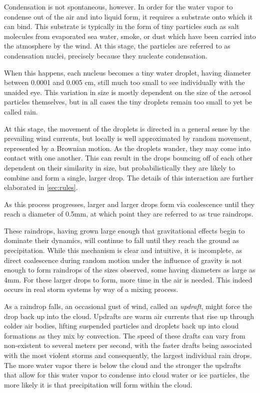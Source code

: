 \documentclass[twocolumn,a4paper,10pt]{article}
\begin{document}
Condensation is not spontaneous, however. In order for the water vapor to
condense out of the air and into liquid form, it requires a substrate onto which
it can bind.  This substrate is typically in the form of tiny particles such as
salt molecules from evaporated sea water, smoke, or dust which have been carried
into the atmosphere by the wind. At this stage, the particles are referred to as
condensation nuclei, precisely because they nucleate condensation.

When this happens, each nucleus becomes a tiny water droplet, having diameter
between 0.0001 and 0.005 cm, still much too small to see individually with the
unaided eye. This variation in size is mostly dependent on the size of the
aerosol particles themselves, but in all cases the tiny droplets remain too
small to yet be called rain.

At this stage, the movement of the droplets is directed in a general sense by
the prevailing wind currents, but locally is well approximated by random
movement, represented by a Brownian motion. As the droplets wander, they may
come into contact with one another. This can result in the drops bouncing off of
each other dependent on their similarity in size, but probabilistically they
are likely to combine and form a single, larger drop. The details of this
interaction are further elaborated in \autoref{sec:rules}.

As this process progresses, larger and larger drops form via coalescence until
they reach a diameter of 0.5mm, at which point they are referred to as true
raindrops.

These raindrops, having grown large enough that gravitational effects begin to
dominate their dynamics, will continue to fall until they reach the ground as
precipitation. While this mechanism is clear and intuitive, it is incomplete, as
direct coalescence during random motion under the influence of gravity is not
enough to form raindrops of the sizes observed, some having diameters as large
as 4mm. For these larger drops to form, more time in the air is needed. This
indeed occurs in real storm systems by way of a mixing process.

As a raindrop falls, an occasional gust of wind, called an \emph{updraft}, might
force the drop back up into the cloud. Updrafts are warm air currents that rise
up through colder air bodies, lifting suspended particles and droplets back up
into cloud formations as they mix by convection. The speed of these drafts can
vary from non-existent to several meters per second, with the faster drafts
being associated with the most violent storms and consequently, the largest
individual rain drops. The more water vapor there is below the cloud and the
stronger the updrafts that allow for this water vapor to condense into cloud
water or ice particles, the more likely it is that precipitation will form
within the cloud.
\end{document}
